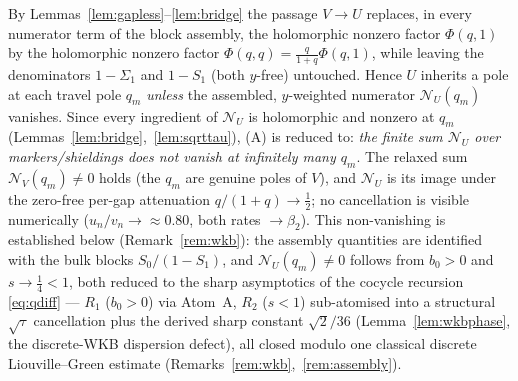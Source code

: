 \begin{proposition}\label{prop:reduceA}
By Lemmas~\ref{lem:gapless}--\ref{lem:bridge} the passage $V\to U$ replaces, in every
numerator term of the block assembly, the holomorphic nonzero factor $\Phi(q,1)$ by
the holomorphic nonzero factor $\Phi(q,q)=\tfrac{q}{1+q}\Phi(q,1)$, while leaving the
denominators $1-\Sigma_1$ and $1-S_1$ \textup(both $y$-free\textup) untouched. Hence
$U$ inherits a pole at each travel pole $q_m$ \emph{unless} the assembled, $y$-weighted
numerator $\mathcal N_U(q_m)$ vanishes. Since every ingredient of $\mathcal N_U$ is
holomorphic and nonzero at $q_m$ \textup(Lemmas~\ref{lem:bridge},~\ref{lem:sqrttau}\textup),
(A) is reduced to: \emph{the finite sum $\mathcal N_U$ over markers/shieldings does not
vanish at infinitely many $q_m$}. The relaxed sum $\mathcal N_V(q_m)\ne0$ holds
\textup(the $q_m$ are genuine poles of $V$\textup), and $\mathcal N_U$ is its image
under the zero-free per-gap attenuation $q/(1+q)\to\tfrac12$; no cancellation is
visible numerically \textup($u_n/v_n\to{\approx}0.80$, both rates $\to\beta_2$\textup).
This non-vanishing is established below (Remark~\ref{rem:wkb}): the assembly quantities
are identified with the bulk blocks $S_0/(1-S_1)$, and $\mathcal N_U(q_m)\ne0$ follows
from $b_0>0$ and $s\to\tfrac14<1$, both reduced to the sharp asymptotics of the cocycle recursion
\eqref{eq:qdiff} --- $R_1$ ($b_0>0$) via Atom~A, $R_2$ ($s<1$) sub-atomised into a structural $\sqrt\tau$
cancellation plus the derived sharp constant $\sqrt2/36$ (Lemma~\ref{lem:wkbphase}, the discrete-WKB dispersion
defect), all closed modulo one classical discrete Liouville--Green estimate (Remarks~\ref{rem:wkb},~\ref{rem:assembly}).
\end{proposition}

